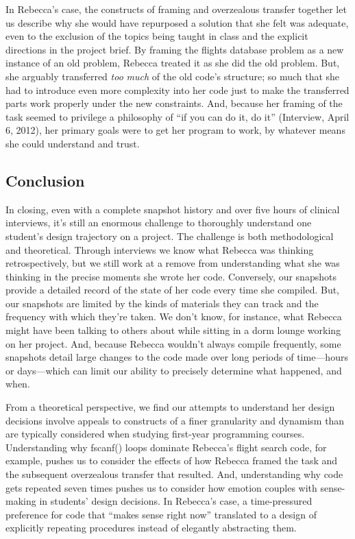 In Rebecca's case, the constructs of framing and overzealous transfer together let us describe why she would have repurposed a solution that she felt was adequate, even to the exclusion of the topics being taught in class and the explicit directions in the project brief. By framing the flights database problem as a new instance of an old problem, Rebecca treated it as she did the old problem. But, she arguably transferred \emph{too} \emph{much} of the old code's structure; so much that she had to introduce even more complexity into her code just to make the transferred parts work properly under the new constraints. And, because her framing of the task seemed to privilege a philosophy of ``if you can do it, do it'' (Interview, April 6, 2012), her primary goals were to get her program to work, by whatever means she could understand and trust.

\subsection{Conclusion}\label{conclusion}

In closing, even with a complete snapshot history and over five hours of clinical interviews, it's still an enormous challenge to thoroughly understand one student's design trajectory on a project. The challenge is both methodological and theoretical. Through interviews we know what Rebecca was thinking retrospectively, but we still work at a remove from understanding what she was thinking in the precise moments she wrote her code. Conversely, our snapshots provide a detailed record of the state of her code every time she compiled. But, our snapshots are limited by the kinds of materials they can track and the frequency with which they're taken. We don't know, for instance, what Rebecca might have been talking to others about while sitting in a dorm lounge working on her project. And, because Rebecca wouldn't always compile frequently, some snapshots detail large changes to the code made over long periods of time---hours or days---which can limit our ability to precisely determine what happened, and when.

From a theoretical perspective, we find our attempts to understand her design decisions involve appeals to constructs of a finer granularity and dynamism than are typically considered when studying first-year programming courses. Understanding why fscanf() loops dominate Rebecca's flight search code, for example, pushes us to consider the effects of how Rebecca framed the task and the subsequent overzealous transfer that resulted. And, understanding why code gets repeated seven times pushes us to consider how emotion couples with sense-making in students' design decisions. In Rebecca's case, a time-pressured preference for code that ``makes sense right now'' translated to a design of explicitly repeating procedures instead of elegantly abstracting them.

